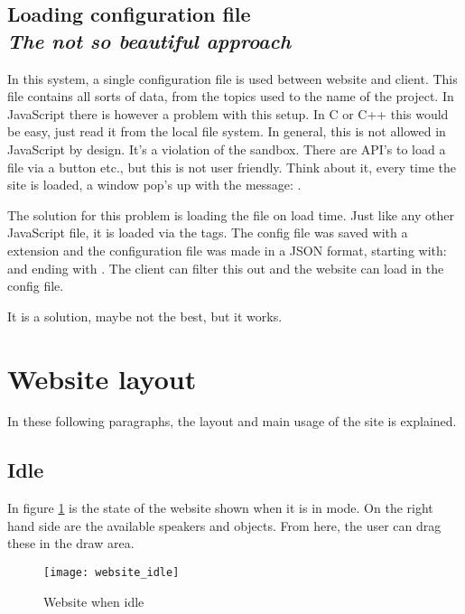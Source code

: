 \subsection{Loading configuration file\\
    \small\nimbus\textit{The not so beautiful approach}}
In this system, a single configuration file is used between website and client.
This file contains all sorts of data, from the topics used to the name of the project.
In JavaScript there is however a problem with this setup. In C or C++ this would be easy, just read it from the local file system.
In general, this is not allowed in JavaScript by design. It's a violation of the sandbox.
There are API's to load a file via a button etc., but this is not user friendly.
Think about it, every time the site is loaded, a window pop's up with the message:
.

The solution for this problem is loading the file on load time. Just like any other JavaScript file, it is loaded via the  tags.
The config file was saved with a  extension and the configuration file was made in a JSON format, starting with:  and ending with \say{;}.
The client can filter this out and the website can load in the config file.

It is a solution, maybe not the best, but it works.

\section{Website layout}
In these following paragraphs, the layout and main usage of the site is explained.

\subsection{Idle}
\label{sub:website_idle}
In figure \ref{fig:website_idle} is the state of the website shown when it is in  mode.
On the right hand side are the available speakers and objects.
From here, the user can drag these in the draw area.

\begin{figure}[H]
    \centering
    \texttt{[image: website\_idle]}
    \caption{Website when idle}
    \label{fig:website_idle}
\end{figure}

